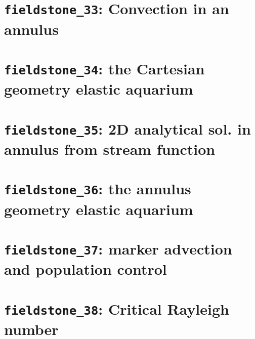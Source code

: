 \documentclass[a4paper]{article}
\begin{document}
\section{{\tt fieldstone\_33}: Convection in an annulus \label{f33}} %
\newpage %
\section{{\tt fieldstone\_34}: the Cartesian geometry elastic aquarium \label{f34}}
\newpage %
\section{{\tt fieldstone\_35}: 2D analytical sol. in annulus from stream function \label{f35}}
\newpage %
\section{{\tt fieldstone\_36}: the annulus geometry elastic aquarium \label{f36}}%
\newpage %
\section{{\tt fieldstone\_37}: marker advection and population control \label{f37}}
\newpage %
\section{{\tt fieldstone\_38}: Critical Rayleigh number \label{f38}} %
\end{document}
